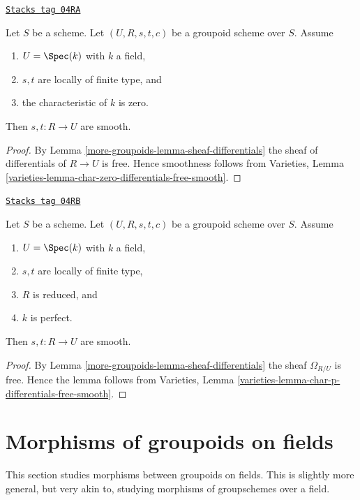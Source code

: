 \begin{lemma}
\label{more-groupoids-lemma-groupoid-characteristic-zero-smooth}
\href{https://stacks.math.columbia.edu/tag/04RA}{\texttt{Stacks tag 04RA}}

Let $S$ be a scheme. Let $(U, R, s, t, c)$ be a groupoid scheme
over $S$. Assume
\begin{enumerate}
\item $U = \Spec(k)$ with $k$ a field,
\item $s, t$ are locally of finite type, and
\item the characteristic of $k$ is zero.
\end{enumerate}
Then $s, t : R \to U$ are smooth.
\end{lemma}

\begin{proof}
By
Lemma \ref{more-groupoids-lemma-sheaf-differentials}
the sheaf of differentials of $R \to U$ is free.
Hence smoothness follows from
Varieties, Lemma \ref{varieties-lemma-char-zero-differentials-free-smooth}.
\end{proof}

\begin{lemma}
\label{more-groupoids-lemma-reduced-group-scheme-perfect-field-characteristic-p-smooth}
\href{https://stacks.math.columbia.edu/tag/04RB}{\texttt{Stacks tag 04RB}}

Let $S$ be a scheme. Let $(U, R, s, t, c)$ be a groupoid scheme
over $S$. Assume
\begin{enumerate}
\item $U = \Spec(k)$ with $k$ a field,
\item $s, t$ are locally of finite type,
\item $R$ is reduced, and
\item $k$ is perfect.
\end{enumerate}
Then $s, t : R \to U$ are smooth.
\end{lemma}

\begin{proof}
By
Lemma \ref{more-groupoids-lemma-sheaf-differentials}
the sheaf $\Omega_{R/U}$ is free. Hence the lemma follows from
Varieties, Lemma \ref{varieties-lemma-char-p-differentials-free-smooth}.
\end{proof}

\section{Morphisms of groupoids on fields}
\label{more-groupoids-section-morphisms-groupoids-on-fields}
This section studies morphisms between groupoids on fields.
This is slightly more general, but very akin to, studying
morphisms of groupschemes over a field.

